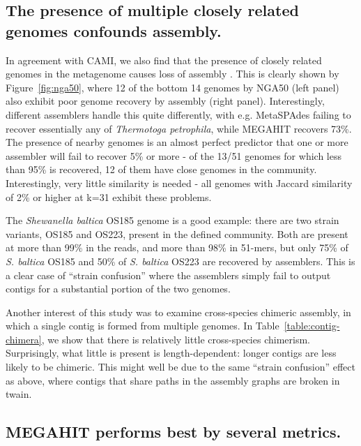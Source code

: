 \documentclass[11pt]{article}
\begin{document}


\subsection*{The presence of multiple closely related genomes confounds assembly.}

In agreement with CAMI, we also find that the presence of closely related
genomes in the metagenome causes loss of assembly \cite{CAMI}.  This is
clearly shown by Figure~\ref{fig:nga50}, where 12 of the bottom 14
genomes by NGA50 (left panel) also exhibit poor genome recovery by
assembly (right panel).  Interestingly, different assemblers handle
this quite differently, with e.g. MetaSPAdes failing to recover
essentially any of {\em Thermotoga petrophila}, while MEGAHIT recovers
73\%.  The presence of nearby genomes is an almost perfect predictor
that one or more assembler will fail to recover 5\% or more - of the
13/51 genomes for which less than 95\% is recovered, 12 of them have
close genomes in the community.  Interestingly, very little similarity
is needed - all genomes with Jaccard similarity of 2\% or higher at k=31
exhibit these problems.

The {\em Shewanella baltica} OS185 genome is a good example: there
are two strain variants, OS185 and OS223, present in the defined
community.  Both are present at more than 99\% in the reads, and more
than 98\% in 51-mers, but only 75\% of {\em S. baltica} OS185 and 50\%
of {\em S. baltica} OS223 are recovered by assemblers.  This is a
clear case of ``strain confusion'' where the assemblers simply fail to
output contigs for a substantial portion of the two genomes.

Another interest of this study was to examine cross-species chimeric
assembly, in which a single contig is formed from multiple genomes.
In Table~\ref{table:contig-chimera}, we show that there is relatively
little cross-species chimerism.  Surprisingly, what little is present is
length-dependent: longer contigs are less likely to be chimeric.  This
might well be due to the same ``strain confusion'' effect as above,
where contigs that share paths in the assembly graphs are broken in twain.

\subsection*{MEGAHIT performs best by several metrics.}
\end{document}
